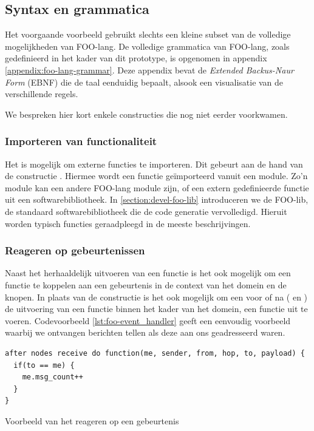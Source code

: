 \subsection{Syntax en grammatica}
\label{subsection:devel-foo-lang-grammar}

Het voorgaande voorbeeld gebruikt slechts een kleine subset van de volledige
mogelijkheden van FOO-lang. De volledige grammatica van FOO-lang, zoals
gedefinieerd in het kader van dit prototype, is opgenomen in appendix
\ref{appendix:foo-lang-grammar}. Deze appendix bevat de \emph{Extended
Backus-Naur Form} (EBNF) die de taal eenduidig bepaalt, alsook een visualisatie
van de verschillende regels.

We bespreken hier kort enkele constructies die nog niet eerder voorkwamen.

\subsubsection{Importeren van functionaliteit}

Het is mogelijk om externe functies te importeren. Dit gebeurt aan de hand van
de constructie . Hiermee wordt een functie
ge\"importeerd vanuit een module. Zo'n module kan een andere FOO-lang module
zijn, of een extern gedefinieerde functie uit een softwarebibliotheek. In
\ref{section:devel-foo-lib} introduceren we de FOO-lib, de standaard
softwarebibliotheek die de code generatie vervolledigd. Hieruit worden typisch
functies geraadpleegd in de meeste beschrijvingen.

\subsubsection{Reageren op gebeurtenissen}

Naast het herhaaldelijk uitvoeren van een functie is het ook mogelijk om een
functie te koppelen aan een gebeurtenis in de context van het domein en de
knopen. In plaats van de  constructie is het ook mogelijk om
een voor of na ( en ) de uitvoering van een functie
binnen het kader van het domein, een functie uit te voeren. Codevoorbeeld
\ref{lst:foo-event_handler} geeft een eenvoudig voorbeeld waarbij we ontvangen
berichten tellen als deze aan ons geadresseerd waren.

\begin{listing}[ht]
  \begin{verbatim}
after nodes receive do function(me, sender, from, hop, to, payload) {
  if(to == me) {
    me.msg_count++
  }
}
  \end{verbatim}
  \vspace{-5mm}
  \caption{Voorbeeld van het reageren op een gebeurtenis}
  \label{lst:foo-event_handler}
\end{listing}

